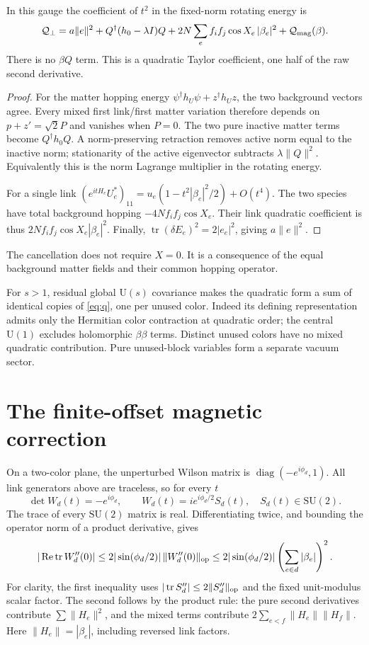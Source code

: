 \documentclass[11pt,a4paper]{article}
\newcommand{\tr}{\operatorname{tr}}\newcommand{\diag}{\operatorname{diag}}\newcommand{\Rea}{\operatorname{Re}}\newcommand{\id}{\mathbf1}
\begin{document}
\begin{lemma}\label{lem:cancel}
In this gauge the coefficient of $t^2$ in the fixed-norm rotating energy is
\begin{equation}\label{eq:q}
\mathcal Q_\perp=a\|e\|^2+Q^\dagger(h_0-\lambda I)Q
+2N\sum_e f_if_j\cos X_e\,|\beta_e|^2+\mathcal Q_{\rm mag}(\beta).
\end{equation}
There is no $\beta Q$ term. This is a quadratic Taylor coefficient, one half of the raw second derivative.
\end{lemma}
\begin{proof}
For the matter hopping energy $\psi^\dagger h_U\psi+z^\dagger h_Uz$, the two background vectors agree. Every mixed first link/first matter variation therefore depends on $p+z'=\sqrt2P$ and vanishes when $P=0$. The two pure inactive matter terms become $Q^\dagger h_0Q$. A norm-preserving retraction removes active norm equal to the inactive norm; stationarity of the active eigenvector subtracts $\lambda\|Q\|^2$. Equivalently this is the norm Lagrange multiplier in the rotating energy.

For a single link $(e^{itH_e}U_e^*)_{11}=u_e(1-t^2|\beta_e|^2/2)+O(t^4)$. The two species have total background hopping $-4Nf_if_j\cos X_e$. Their link quadratic coefficient is thus $2Nf_if_j\cos X_e|\beta_e|^2$. Finally, $\tr(\delta E_e)^2=2|e_e|^2$, giving $a\|e\|^2$.
\end{proof}
The cancellation does not require $X=0$. It is a consequence of the equal background matter fields and their common hopping operator.

For $s>1$, residual global $\mathrm U(s)$ covariance makes the quadratic form a sum of identical copies of \eqref{eq:q}, one per unused color. Indeed its defining representation admits only the Hermitian color contraction at quadratic order; the central $\mathrm U(1)$ excludes holomorphic $\beta\beta$ terms. Distinct unused colors have no mixed quadratic contribution. Pure unused-block variables form a separate vacuum sector.
\newpage
\section{The finite-offset magnetic correction}
On a two-color plane, the unperturbed Wilson matrix is $\diag(-e^{i\phi_d},1)$. All link generators above are traceless, so for every $t$
\[
\det W_d(t)=-e^{i\phi_d},\qquad
W_d(t)=i e^{i\phi_d/2}S_d(t),\quad S_d(t)\in\mathrm{SU}(2).
\]
The trace of every $\mathrm{SU}(2)$ matrix is real. Differentiating twice, and bounding the operator norm of a product derivative, gives
\[
|\Rea\tr W_d''(0)|
\le 2|\sin(\phi_d/2)|\,\|W_d''(0)\|_{\rm op}
\le 2|\sin(\phi_d/2)|\left(\sum_{e\in d}|\beta_e|\right)^2.
\]
For clarity, the first inequality uses $|\tr S_d''|\le2\|S_d''\|_{\rm op}$ and the fixed unit-modulus scalar factor. The second follows by the product rule: the pure second derivatives contribute $\sum\|H_e\|^2$, and the mixed terms contribute $2\sum_{e<f}\|H_e\|\|H_f\|$. Here $\|H_e\|=|\beta_e|$, including reversed link factors.
\end{document}
